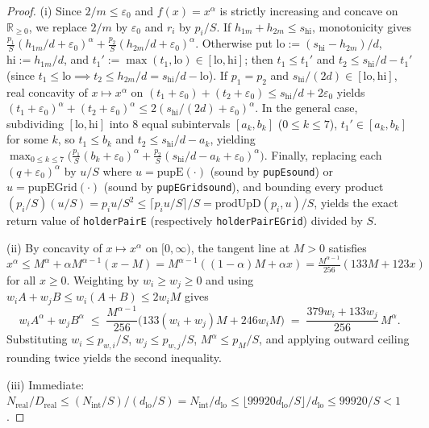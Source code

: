 \documentclass[11pt,reqno]{amsart}
\theoremstyle{plain}
\theoremstyle{definition}
\theoremstyle{remark}
\DeclareRobustCommand{\_}{\ifmmode\text{\textunderscore}\else\textunderscore\allowbreak\fi}
\begin{document}
\begin{proof}
(i) Since $2/m \le \varepsilon_0$ and $f(x) = x^\alpha$ is strictly increasing and concave on $\mathbb{R}_{\ge 0}$, we replace $2/m$ by $\varepsilon_0$ and $r_i$ by $p_i/S$. If $h_{1m} + h_{2m} \le s_{\mathrm{hi}}$, monotonicity gives $\frac{p_1}{S}(h_{1m}/d + \varepsilon_0)^\alpha + \frac{p_2}{S}(h_{2m}/d + \varepsilon_0)^\alpha$. Otherwise put $\mathrm{lo} := (s_{\mathrm{hi}} - h_{2m})/d$, $\mathrm{hi} := h_{1m}/d$, and $t_1' := \max(t_1, \mathrm{lo}) \in [\mathrm{lo}, \mathrm{hi}]$; then $t_1 \le t_1'$ and $t_2 \le s_{\mathrm{hi}}/d - t_1'$ (since $t_1 \le \mathrm{lo} \implies t_2 \le h_{2m}/d = s_{\mathrm{hi}}/d - \mathrm{lo}$). If $p_1 = p_2$ and $s_{\mathrm{hi}}/(2d) \in [\mathrm{lo}, \mathrm{hi}]$, real concavity of $x \mapsto x^\alpha$ on $(t_1 + \varepsilon_0) + (t_2 + \varepsilon_0) \le s_{\mathrm{hi}}/d + 2\varepsilon_0$ yields $(t_1 + \varepsilon_0)^\alpha + (t_2 + \varepsilon_0)^\alpha \le 2(s_{\mathrm{hi}}/(2d) + \varepsilon_0)^\alpha$. In the general case, subdividing $[\mathrm{lo}, \mathrm{hi}]$ into $8$ equal subintervals $[a_k, b_k]$ ($0 \le k \le 7$), $t_1' \in [a_k, b_k]$ for some $k$, so $t_1 \le b_k$ and $t_2 \le s_{\mathrm{hi}}/d - a_k$, yielding $\max_{0 \le k \le 7}\bigl(\frac{p_1}{S}(b_k + \varepsilon_0)^\alpha + \frac{p_2}{S}(s_{\mathrm{hi}}/d - a_k + \varepsilon_0)^\alpha\bigr)$. Finally, replacing each $(q + \varepsilon_0)^\alpha$ by $u/S$ where $u = \mathrm{pupE}(\cdot)$ (sound by \texttt{pupE\_sound}) or $u = \mathrm{pupEGrid}(\cdot)$ (sound by \texttt{pupEGrid\_sound}), and bounding every product $(p_i/S)(u/S) = p_i u / S^2 \le \lceil p_i u / S \rceil / S = \mathrm{prodUpD}(p_i, u) / S$, yields the exact return value of \texttt{holderPairE} (respectively \texttt{holderPairEGrid}) divided by $S$.

(ii) By concavity of $x \mapsto x^\alpha$ on $[0, \infty)$, the tangent line at $M > 0$ satisfies $x^\alpha \le M^\alpha + \alpha M^{\alpha - 1}(x - M) = M^{\alpha - 1}((1 - \alpha)M + \alpha x) = \frac{M^{\alpha - 1}}{256}(133 M + 123 x)$ for all $x \ge 0$. Weighting by $w_i \ge w_j \ge 0$ and using $w_i A + w_j B \le w_i(A + B) \le 2 w_i M$ gives
\[
  w_i A^\alpha + w_j B^\alpha \;\le\; \frac{M^{\alpha - 1}}{256}\bigl(133(w_i + w_j)M + 246 w_i M\bigr) \;=\; \frac{379 w_i + 133 w_j}{256}\, M^\alpha.
\]
Substituting $w_i \le p_{w,i}/S$, $w_j \le p_{w,j}/S$, $M^\alpha \le p_M/S$, and applying outward ceiling rounding twice yields the second inequality.

(iii) Immediate: $N_{\mathrm{real}} / D_{\mathrm{real}} \le (N_{\mathrm{int}} / S) / (d_{\mathrm{lo}} / S) = N_{\mathrm{int}} / d_{\mathrm{lo}} \le \lfloor 99920 d_{\mathrm{lo}} / S \rfloor / d_{\mathrm{lo}} \le 99920 / S < 1$.
\end{proof}
\end{document}

